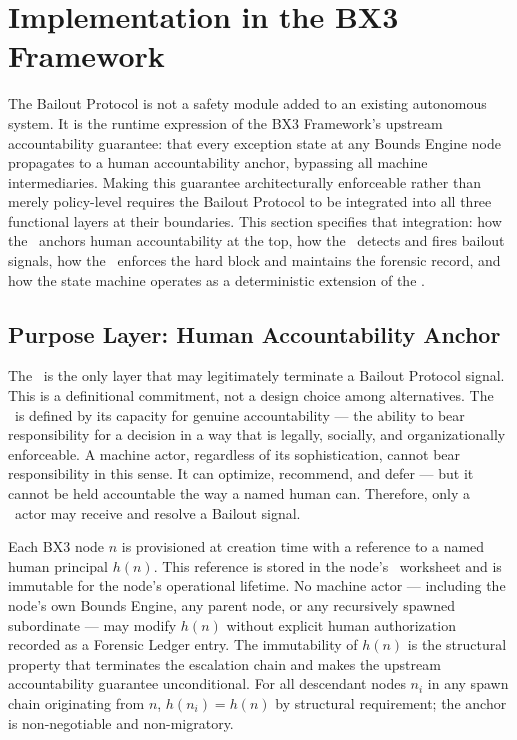 \section{Implementation in the BX3 Framework}
\label{sec:bailout-implementation}

The Bailout Protocol is not a safety module added to an existing autonomous system. It is the runtime expression of the BX3 Framework's upstream accountability guarantee: that every exception state at any Bounds Engine node propagates to a human accountability anchor, bypassing all machine intermediaries. Making this guarantee architecturally enforceable rather than merely policy-level requires the Bailout Protocol to be integrated into all three functional layers at their boundaries. This section specifies that integration: how the \purpose\ anchors human accountability at the top, how the \bounds\ detects and fires bailout signals, how the \fact\ enforces the hard block and maintains the forensic record, and how the state machine operates as a deterministic extension of the \fact.

\subsection{Purpose Layer: Human Accountability Anchor}
\label{sec:purpose-anchor}

The \purpose\ is the only layer that may legitimately terminate a Bailout Protocol signal. This is a definitional commitment, not a design choice among alternatives. The \purpose\ is defined by its capacity for genuine accountability --- the ability to bear responsibility for a decision in a way that is legally, socially, and organizationally enforceable. A machine actor, regardless of its sophistication, cannot bear responsibility in this sense. It can optimize, recommend, and defer --- but it cannot be held accountable the way a named human can. Therefore, only a \purpose\ actor may receive and resolve a Bailout signal.

Each BX3 node $n$ is provisioned at creation time with a reference to a named human principal $h(n)$. This reference is stored in the node's \purpose\ worksheet and is immutable for the node's operational lifetime. No machine actor --- including the node's own Bounds Engine, any parent node, or any recursively spawned subordinate --- may modify $h(n)$ without explicit human authorization recorded as a Forensic Ledger entry. The immutability of $h(n)$ is the structural property that terminates the escalation chain and makes the upstream accountability guarantee unconditional. For all descendant nodes $n_i$ in any spawn chain originating from $n$, $h(n_i) = h(n)$ by structural requirement; the anchor is non-negotiable and non-migratory.

